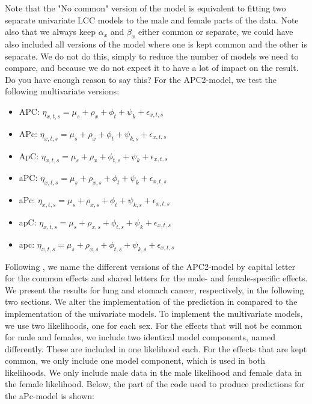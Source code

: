 Note that the "No common" version of the model is equivalent to fitting two separate univariate LCC models to the male and female parts of the data. Note also that we always keep $\alpha_x$ and $\beta_x$ either common or separate, we could have also included all versions of the model where one is kept common and the other is separate. We do not do this, simply to reduce the number of models we need to compare, and because we do not expect it to have a lot of impact on the result. \textcolor{myDarkGreen}{Do you have enough reason to say this? }
For the APC2-model, we test the following multivariate versions:
\begin{itemize}
    \item APC: $\eta_{x,t,s}= \mu_{s} + \rho_x + \phi_t + \psi_k + \epsilon_{x,t,s}$ 
    \item APc: $\eta_{x,t,s}= \mu_{s} + \rho_x + \phi_t + \psi_{k,s} + \epsilon_{x,t,s}$ 
    \item ApC: $\eta_{x,t,s}= \mu_{s} + \rho_x + \phi_{t,s} + \psi_{k} + \epsilon_{x,t,s}$ 
    \item aPC: $\eta_{x,t,s}= \mu_{s} + \rho_{x,s} + \phi_{t} + \psi_{k} + \epsilon_{x,t,s}$ 
    \item aPc: $\eta_{x,t,s}= \mu_{s} + \rho_{x,s} + \phi_{t} + \psi_{k,s} + \epsilon_{x,t,s}$ 
    \item apC: $\eta_{x,t,s}= \mu_{s} + \rho_{x,s} + \phi_{t, s} + \psi_{k} + \epsilon_{x,t,s}$ 
    \item apc: $\eta_{x,t,s}= \mu_{s} + \rho_{x,s} + \phi_{t, s} + \psi_{k, s} + \epsilon_{x,t,s}$
\end{itemize}
Following \textcite{rieblerHeld2010}, we name the different versions of the APC2-model by capital letter for the common effects and shared letters for the male- and female-specific effects. We present the results for lung and stomach cancer, respectively, in the following two sections. 
\newpar We alter the implementation of the prediction in \inlabru compared to the implementation of the univariate models. To implement the multivariate models, we use two likelihoods, one for each sex. For the effects that will not be common for male and females, we include two identical model components, named differently. These are included in one likelihood each. For the effects that are kept common, we only include one model component, which is used in both likelihoods. We only include male data in the male likelihood and female data in the female likelihood. Below, the part of the code used to produce predictions for the aPc-model is shown:


